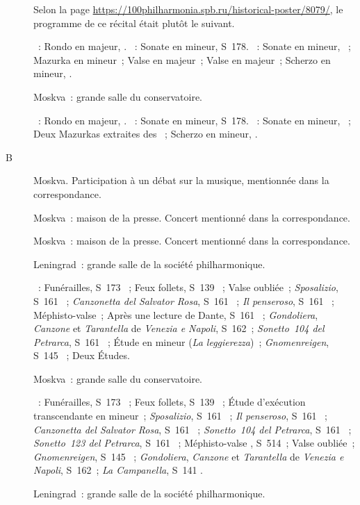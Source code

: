 \begin{description}
 Selon la page
 \href{https://100philharmonia.spb.ru/historical-poster/8079/}%
 {https://100philharmonia.spb.ru/historical-poster/8079/}, le programme de
 ce récital était plutôt le suivant.

 \textsc{\Beethoven{}}~: Rondo en \kG majeur,  .
 \textsc{\Liszt{}}~: Sonate en \kB mineur, S~178.
 \textsc{\Chopin{}}~: Sonate  en \kB \Flat mineur, ~;
 Mazurka en \kC \Sharp mineur~; Valse en \kA \Flat majeur~; Valse en \kD
 \Flat majeur~; Scherzo  en \kB \Flat mineur, .
 \item[\DateWithWeekDay{1932-03-18}]
 Moskva~: grande salle du conservatoire.

 \textsc{\Beethoven{}}~: Rondo en \kG majeur,  .
 \textsc{\Liszt{}}~: Sonate en \kB mineur, S~178.
 \textsc{\Chopin{}}~: Sonate en \kB \Flat mineur, ~; Deux Mazurkas
 extraites des ~; Scherzo en \kB \Flat mineur, .
 \item[B\DateWithWeekDay{1932-04-02}]
 Moskva.
 Participation à un débat sur la musique, mentionnée dans la correspondance.
 \item[\DateWithWeekDay{1932-04-06}]
 Moskva~: maison de la presse.
 Concert mentionné dans la correspondance.
 \item[\DateWithWeekDay{1932-04-12}]
 Moskva~: maison de la presse.
 Concert mentionné dans la correspondance.
 \item[\DateWithWeekDay{1932-04-19}]
 Leningrad~: grande salle de la société philharmonique.

 \textsc{\Liszt{}}~: Funérailles, S~173 ~; Feux follets, S~139
 ~; Valse oubliée~; \emph{Sposalizio}, S~161 ~;
 \emph{Canzonetta del Salvator Rosa}, S~161 ~; \emph{Il
 penseroso}, S~161 ~; Méphisto-valse~; Après une lecture de Dante,
 S~161 ~; \emph{Gondoliera}, \emph{Canzone} et \emph{Tarantella}
 de \emph{Venezia e Napoli}, S~162~; \emph{Sonetto~104 del Petrarca}, S~161
 ~; Étude en \kF mineur (\emph{La leggierezza})~;
 \emph{Gnomenreigen}, S~145 ~; Deux Études.
 \item[\DateWithWeekDay{1932-04-20}]
 Moskva~: grande salle du conservatoire.

 \textsc{\Liszt{}}~: Funérailles, S~173 ~; Feux follets, S~139
 ~; Étude d'exécution transcendante  en \kF mineur~;
 \emph{Sposalizio}, S~161 ~; \emph{Il penseroso}, S~161
 ~; \emph{Canzonetta del Salvator Rosa}, S~161 ~;
 \emph{Sonetto~104 del Petrarca}, S~161 ~; \emph{Sonetto~123 del
 Petrarca}, S~161 ~; Méphisto-valse , S~514~; Valse
 oubliée~; \emph{Gnomenreigen}, S~145 ~; \emph{Gondoliera},
 \emph{Canzone} et \emph{Tarantella} de \emph{Venezia e Napoli}, S~162~;
 \emph{La Campanella}, S~141 .
 \item[\DateWithWeekDay{1932-04-25}]
 Leningrad~: grande salle de la société philharmonique.


\end{description}
